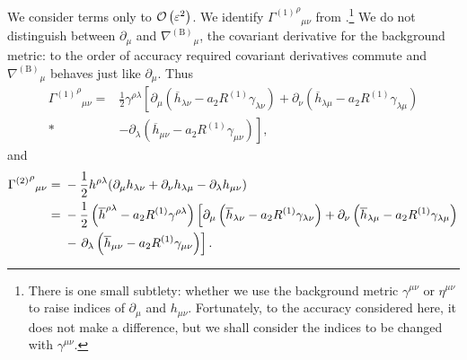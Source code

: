We consider terms only to $\mathcal{O}\left({\varepsilon^2}\right)$. We identify ${{\Gamma^{(1)}}^\rho}_{\mu\nu}$ from .\footnote{There is one small subtlety: whether we use the background metric $\gamma^{\mu\nu}$ or $\eta^{\mu\nu}$ to raise indices of $\partial_\mu$ and $h_{\mu\nu}$. Fortunately, to the accuracy considered here, it does not make a difference, but we shall consider the indices to be changed with $\gamma^{\mu\nu}$.} We do not distinguish between $\partial_\mu$ and ${\nabla^{(\text{B})}}_\mu$, the covariant derivative for the background metric: to the order of accuracy required covariant derivatives commute and ${\nabla^{(\text{B})}}_\mu$ behaves just like $\partial_\mu$. Thus
\begin{align}
{{\Gamma^{(1)}}^\rho}_{\mu\nu} = {} & \frac{1}{2}\gamma^{\rho\lambda}\left[\partial_\mu \left(\overline{h}_{\lambda\nu} - a_2 R^{(1)}\gamma_{\lambda\nu}\right) + \partial_\nu \left(\overline{h}_{\lambda\mu} - a_2 R^{(1)}\gamma_{\lambda\mu}\right) \right. \nonumber \\*
 & - \left. \partial_\lambda \left(\overline{h}_{\mu\nu} - a_2 R^{(1)}\gamma_{\mu\nu}\right)\right] ,
\end{align}
and
\begin{align}
{{\Gamma^{(2)}}^\rho}_{\mu\nu} = {} & -\frac{1}{2}h^{\rho\lambda}(\partial_\mu h_{\lambda\nu} + \partial_\nu h_{\lambda\mu} - \partial_\lambda h_{\mu\nu}) \nonumber \\*
 = {} & -\frac{1}{2}\left(\overline{h}^{\rho\lambda} - a_2 R^{(1)}\gamma^{\rho\lambda}\right)\left[\partial_\mu \left(\overline{h}_{\lambda\nu} - a_2 R^{(1)}\gamma_{\lambda\nu}\right) + \partial_\nu \left(\overline{h}_{\lambda\mu} - a_2 R^{(1)}\gamma_{\lambda\mu}\right) \right. \nonumber \\*
 & - \left. \partial_\lambda \left(\overline{h}_{\mu\nu} \vphantom{R^{(1)}} - a_2 R^{(1)}\gamma_{\mu\nu}\right)\right].
\end{align}

